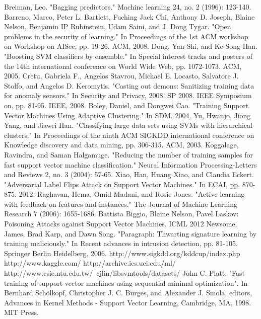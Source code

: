 \documentclass[10pt,conference,compsocconf,letterpaper]{IEEEtran}
\begin{document}
\begin{thebibliography}{9}

Breiman, Leo. "Bagging predictors." Machine learning 24, no. 2 (1996): 123-140.
Barreno, Marco, Peter L. Bartlett, Fuching Jack Chi, Anthony D. Joseph, Blaine Nelson, Benjamin IP Rubinstein, Udam Saini, and J. Doug Tygar. "Open problems in the security of learning." In Proceedings of the 1st ACM workshop on Workshop on AISec, pp. 19-26. ACM, 2008.
Dong, Yan-Shi, and Ke-Song Han. "Boosting SVM classifiers by ensemble." In Special interest tracks and posters of the 14th international conference on World Wide Web, pp. 1072-1073. ACM, 2005.
Cretu, Gabriela F., Angelos Stavrou, Michael E. Locasto, Salvatore J. Stolfo, and Angelos D. Keromytis. "Casting out demons: Sanitizing training data for anomaly sensors." In Security and Privacy, 2008. SP 2008. IEEE Symposium on, pp. 81-95. IEEE, 2008.
Boley, Daniel, and Dongwei Cao. "Training Support Vector Machines Using Adaptive Clustering." In SDM. 2004.
Yu, Hwanjo, Jiong Yang, and Jiawei Han. "Classifying large data sets using SVMs with hierarchical clusters." In Proceedings of the ninth ACM SIGKDD international conference on Knowledge discovery and data mining, pp. 306-315. ACM, 2003.
Koggalage, Ravindra, and Saman Halgamuge. "Reducing the number of training samples for fast support vector machine classification." Neural Information Processing-Letters and Reviews 2, no. 3 (2004): 57-65.
Xiao, Han, Huang Xiao, and Claudia Eckert. "Adversarial Label Flips Attack on Support Vector Machines." In ECAI, pp. 870-875. 2012.
Raghavan, Hema, Omid Madani, and Rosie Jones. "Active learning with feedback on features and instances." The Journal of Machine Learning Research 7 (2006): 1655-1686.
Battista Biggio, Blaine Nelson, Pavel Laskov: Poisoning Attacks against Support Vector Machines. ICML 2012
Newsome, James, Brad Karp, and Dawn Song. "Paragraph: Thwarting signature learning by training maliciously." In Recent advances in intrusion detection, pp. 81-105. Springer Berlin Heidelberg, 2006.
http://www.sigkdd.org/kddcup/index.php
http://www.kaggle.com/
http://archive.ics.uci.edu/ml/
http://www.csie.ntu.edu.tw/~cjlin/libsvmtools/datasets/
John C. Platt. "Fast training of support vector machines using sequential minimal optimization". In Bernhard Schölkopf, Christopher J. C. Burges, and Alexander J. Smola, editors, Advances in Kernel Methods - Support Vector Learning, Cambridge, MA, 1998. MIT Press.
\end{thebibliography}
\end{document}
